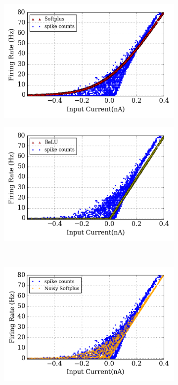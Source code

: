 	\begin{figure}[tbh!]
		\centering
		\begin{subfigure}[t]{0.48\textwidth}
			\includegraphics[width=\textwidth]{pics_iconip/6-5-1.png}
		\end{subfigure}
		\begin{subfigure}[t]{0.48\textwidth}
			\includegraphics[width=\textwidth]{pics_iconip/6-5-2.png}
		\end{subfigure}\\
		\begin{subfigure}[t]{0.6\textwidth}
			\includegraphics[width=\textwidth]{pics_iconip/6-5-3.pdf}

\end{subfigure}
\end{figure}
